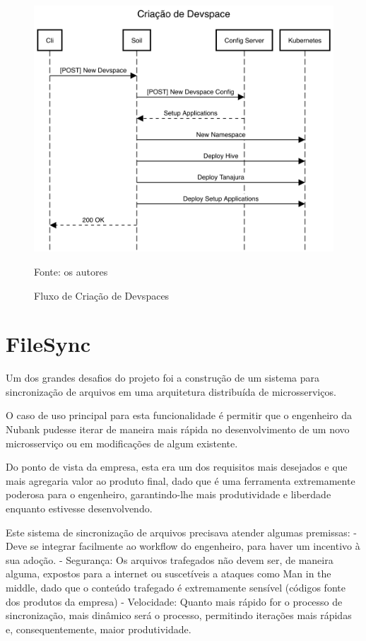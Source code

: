 \documentclass[twosideprint]{politex}
\newcommand{\legend}[1]{\begin{center}\def\caption{}\caption{#1}\end{center}}
\begin{document}
    	\begin{figure}[htbp]
			\caption{\label{fig_create_devspace}Fluxo de Criação de Devspaces}
			\begin{center}
			\includegraphics[scale=0.40]{pictures/create-devspace.png}
			\end{center}
			\legend{Fonte: os autores}
		\end{figure}

	\section{FileSync}

	Um dos grandes desafios do projeto foi a construção de um sistema para sincronização de arquivos em uma arquitetura distribuída de microsserviços.
	
	O caso de uso principal para esta funcionalidade é permitir que o engenheiro da Nubank pudesse iterar de maneira mais rápida no desenvolvimento de um novo microsserviço ou em modificações de algum existente.
	
	Do ponto de vista da empresa, esta era um dos requisitos mais desejados e que mais agregaria valor ao produto final, dado que é uma ferramenta extremamente poderosa para o engenheiro, garantindo-lhe mais produtividade e liberdade enquanto estivesse desenvolvendo.
	
	Este sistema de sincronização de arquivos precisava atender algumas premissas:
	- Deve se integrar facilmente ao workflow do engenheiro, para haver um incentivo à sua adoção.
	- Segurança: Os arquivos trafegados não devem ser, de maneira alguma, expostos para a internet ou suscetíveis a ataques como Man in the middle, dado que o conteúdo trafegado é extremamente sensível (códigos fonte dos produtos da empresa)
	- Velocidade: Quanto mais rápido for o processo de sincronização, mais dinâmico será o processo, permitindo iterações mais rápidas e, consequentemente, maior produtividade.
\end{document}
